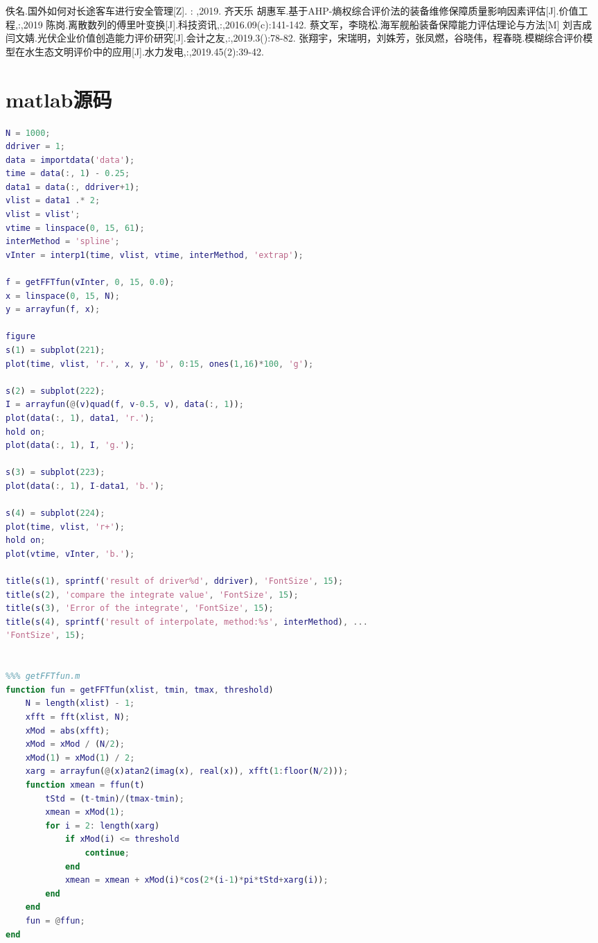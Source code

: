 \documentclass[bwprint]{cumcmthesis}
\begin{document}
    \newpage
    \begin{thebibliography}{9}
         佚名.国外如何对长途客车进行安全管理[Z]. : ,2019.
         齐天乐 胡惠军.基于AHP-熵权综合评价法的装备维修保障质量影响因素评估[J].价值工程,:,2019
         陈岗.离散数列的傅里叶变换[J].科技资讯,:,2016.09(c):141-142.
         蔡文军，李晓松.海军舰船装备保障能力评估理论与方法[M]
         刘吉成 闫文婧.光伏企业价值创造能力评价研究[J].会计之友,:,2019.3():78-82.
        张翔宇，宋瑞明，刘姝芳，张凤燃，谷晓伟，程春晓.模糊综合评价模型在水生态文明评价中的应用[J].水力发电,:,2019.45(2):39-42.
       
    \end{thebibliography}
    \newpage
    \appendix
        \section{matlab源码}
        \begin{lstlisting}[language=matlab]
%%% main.m
N = 1000;
ddriver = 1;
data = importdata('data');
time = data(:, 1) - 0.25;
data1 = data(:, ddriver+1);
vlist = data1 .* 2;
vlist = vlist';
vtime = linspace(0, 15, 61);
interMethod = 'spline';
vInter = interp1(time, vlist, vtime, interMethod, 'extrap');

f = getFFTfun(vInter, 0, 15, 0.0);
x = linspace(0, 15, N);
y = arrayfun(f, x);

figure
s(1) = subplot(221);
plot(time, vlist, 'r.', x, y, 'b', 0:15, ones(1,16)*100, 'g');

s(2) = subplot(222);
I = arrayfun(@(v)quad(f, v-0.5, v), data(:, 1));
plot(data(:, 1), data1, 'r.');
hold on;
plot(data(:, 1), I, 'g.');

s(3) = subplot(223);
plot(data(:, 1), I-data1, 'b.');

s(4) = subplot(224);
plot(time, vlist, 'r+');
hold on;
plot(vtime, vInter, 'b.');

title(s(1), sprintf('result of driver%d', ddriver), 'FontSize', 15);
title(s(2), 'compare the integrate value', 'FontSize', 15);
title(s(3), 'Error of the integrate', 'FontSize', 15);
title(s(4), sprintf('result of interpolate, method:%s', interMethod), ... 
'FontSize', 15);


%%% getFFTfun.m
function fun = getFFTfun(xlist, tmin, tmax, threshold)
    N = length(xlist) - 1;
    xfft = fft(xlist, N);
    xMod = abs(xfft);
    xMod = xMod / (N/2);
    xMod(1) = xMod(1) / 2;
    xarg = arrayfun(@(x)atan2(imag(x), real(x)), xfft(1:floor(N/2)));
    function xmean = ffun(t)
        tStd = (t-tmin)/(tmax-tmin);
        xmean = xMod(1);
        for i = 2: length(xarg)
            if xMod(i) <= threshold
                continue;
            end
            xmean = xmean + xMod(i)*cos(2*(i-1)*pi*tStd+xarg(i));
        end
    end
    fun = @ffun;
end

        \end{lstlisting}
\end{document}
